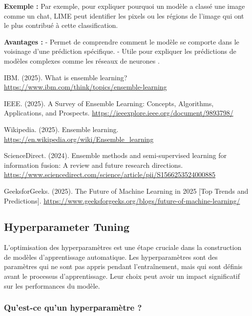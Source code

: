 \documentclass[10pt,a4paper]{article}
\begin{document}
\textbf{Exemple :}
Par exemple, pour expliquer pourquoi un modèle a classé une image comme un chat, LIME peut identifier les pixels ou les régions de l'image qui ont le plus contribué à cette classification.

\textbf{Avantages :}
- Permet de comprendre comment le modèle se comporte dans le voisinage d'une prédiction spécifique.
- Utile pour expliquer les prédictions de modèles complexes comme les réseaux de neurones \cite{ml_trends}.


\begin{thebibliography}{9}
IBM. (2025). What is ensemble learning?
\url{https://www.ibm.com/think/topics/ensemble-learning}

IEEE. (2025). A Survey of Ensemble Learning: Concepts, Algorithms, Applications, and Prospects.
\url{https://ieeexplore.ieee.org/document/9893798/}

Wikipedia. (2025). Ensemble learning.
\url{https://en.wikipedia.org/wiki/Ensemble_learning}

ScienceDirect. (2024). Ensemble methods and semi-supervised learning for information fusion: A review and future research directions.
\url{https://www.sciencedirect.com/science/article/pii/S1566253524000885}

GeeksforGeeks. (2025). The Future of Machine Learning in 2025 [Top Trends and Predictions].
\url{https://www.geeksforgeeks.org/blogs/future-of-machine-learning/}
\end{thebibliography}

\subsection*{Hyperparameter Tuning}

L'optimisation des hyperparamètres est une étape cruciale dans la construction de modèles d'apprentissage automatique. Les hyperparamètres sont des paramètres qui ne sont pas appris pendant l'entraînement, mais qui sont définis avant le processus d'apprentissage. Leur choix peut avoir un impact significatif sur les performances du modèle.

\subsubsection*{Qu'est-ce qu'un hyperparamètre ?}
\end{document}
